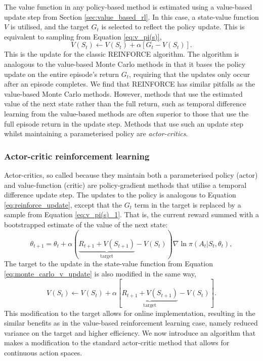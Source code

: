 The value function in any policy-based method is estimated using a value-based update step from Section \ref{sec:value_based_rl}. In this case, a state-value function $V$ is utilised, and the target $G_t$ is selected to reflect the policy update. This is equivalent to sampling from Equation \ref{eq:v_pi(s)},
\begin{equation}
    V(S_t) \leftarrow V(S_t) + \alpha [G_t - V(S_{t})].
    \label{eq:monte_carlo_v_update}
\end{equation}
This is the update for the classic REINFORCE algorithm. The algorithm is analogous to the value-based Monte Carlo methods in that it bases the policy update on the entire episode's return $G_t$, requiring that the updates only occur after an episode completes. 
We find that REINFORCE has similar pitfalls as the value-based Monte Carlo methods.
However, methods that use the estimated value of the next state rather than the full return, such as temporal difference learning from the value-based methods are often superior to those that use the full episode return in the update step. 
Methods that use such an update step whilst maintaining a parameterised policy are \emph{actor-critics}.

\subsubsection{Actor-critic reinforcement learning}
Actor-critics, so called because they maintain both a parameterised policy (actor) and value-function (critic) are policy-gradient methods that utilise a temporal difference update step.
The updates to the policy is analogous to Equation \ref{eq:reinforce_update}, except that the $G_t$ term in the target is replaced by a sample from Equation \ref{eq:v_pi(s)_1}. That is, the current reward summed with a bootstrapped estimate of the value of the next state:
\begin{equation}
    \theta_{t+1} = \theta_{t} + \alpha ( \underbrace{R_{t+1} + V(S_{t+1})}_{\text{target}} - V(S_t) ) \nabla \ln \pi(A_t | S_t, \theta_t),
    \label{eq:actor_critic_update}
\end{equation}
The target to the update in the state-value function from Equation \ref{eq:monte_carlo_v_update} is also modified in the same way,
\begin{equation}
    V(S_t) \leftarrow V(S_t) + \alpha [\underbrace{R_{t+1} + V(S_{t+1})}_{\text{target}} - V(S_{t})].
    \label{eq:actor_critic_v_update}
\end{equation}
This modification to the target allows for online implementation,
resulting in the similar benefits as in the value-based reinforcement learning case, 
namely reduced variance on the target and higher efficiency.
We now introduce an algorithm that makes a modification to the standard actor-critic method that allows for continuous action spaces.

